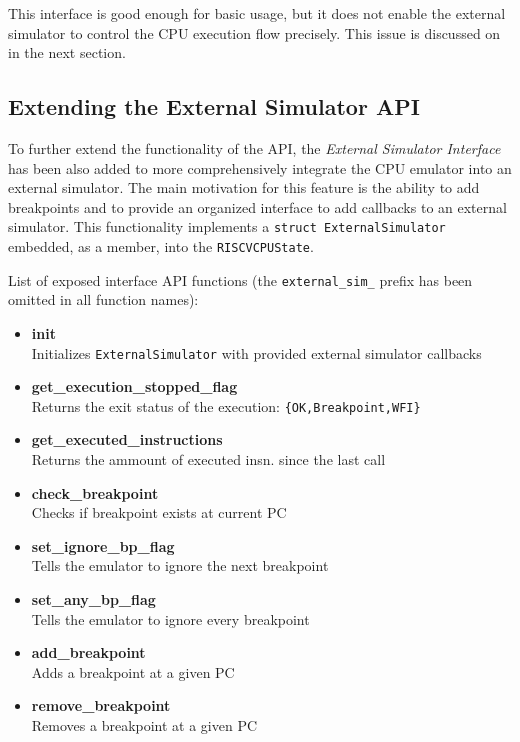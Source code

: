 \noindent
This interface is good enough for basic usage, but it does not enable the external simulator to control the CPU
execution flow precisely. This issue is discussed on in the next section.

\pagebreak

\subsection{Extending the External Simulator API}

To further extend the functionality of the API, the \textit{External Simulator Interface} has been also added
to more comprehensively integrate the CPU emulator into an external simulator. The main motivation for this
feature is the ability to add breakpoints and to provide an organized interface to add callbacks to an external
simulator. This functionality implements a \texttt{struct ExternalSimulator} embedded, as a member, into the
\texttt{RISCVCPUState}.

\vspace{10px}
\noindent
List of exposed interface API functions (the \texttt{external\_sim\_} prefix has been omitted in all function names):
\begin{multicols}{2}
    \begin{itemize}
        \item{\textbf{init}\\Initializes \texttt{ExternalSimulator} with provided external simulator callbacks}
        \item{\textbf{get\_execution\_stopped\_flag}\\Returns the exit status of the execution:
        \texttt{\{OK,Breakpoint,WFI\}}}
        \item{\textbf{get\_executed\_instructions}\\Returns the ammount of executed insn. since the last call}
        \item{\textbf{check\_breakpoint}\\Checks if breakpoint exists at current PC}
        \item{\textbf{set\_ignore\_bp\_flag}\\Tells the emulator to ignore the next breakpoint}
        \item{\textbf{set\_any\_bp\_flag}\\Tells the emulator to ignore every breakpoint}
        \item{\textbf{add\_breakpoint}\\Adds a breakpoint at a given PC}
        \item{\textbf{remove\_breakpoint}\\Removes a breakpoint at a given PC}
    \end{itemize}
\end{multicols}

